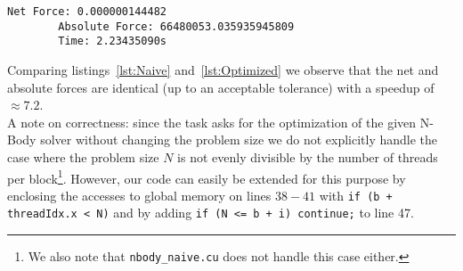 \documentclass[11pt]{article}
\begin{document}
    \begin{lstlisting}[basicstyle=\scriptsize, frame=single, caption={Output
    from running \texttt{nbody\_opt.cu}.}, label={lst:Optimized}]
        Net Force: 0.000000144482
        Absolute Force: 66480053.035935945809
        Time: 2.23435090s
    \end{lstlisting}

    Comparing listings~\ref{lst:Naive} and~\ref{lst:Optimized} we observe that
    the net and absolute forces are identical (up to an acceptable tolerance)
    with a speedup of $\approx 7.2$.\\

    A note on correctness: since the task asks for the optimization of the
    given N-Body solver without changing the problem size we do not
    explicitly handle the case where the problem size $N$ is not evenly
    divisible by the number of threads per block\footnote{We also note that
    \texttt{nbody\_naive.cu} does not handle this case either.}.
    However, our code can easily be extended for this purpose by enclosing
    the accesses to global memory on lines $38 - 41$ with
    \texttt{if (b + threadIdx.x < N)} and by adding
    \texttt{if (N <= b + i) continue;} to line 47.
\end{document}
